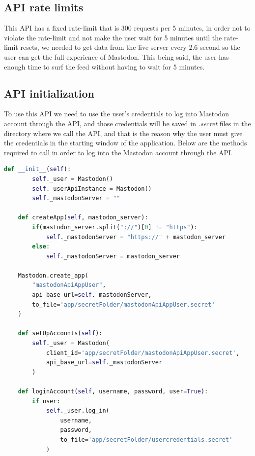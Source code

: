\subsection{API rate limits}\label{ss:rate_lim}
This API has a fixed rate-limit that is 300 requests per 5 minutes, in order not to
violate the rate-limit and not make the user wait for 5 minutes until the rate-limit resets, we
needed to get data from the live server every 2.6 second so the user can get the full
experience of Mastodon. This being said, the user has enough time to surf the feed without having
to wait for 5 minutes.
\subsection{API initialization}\label{ss:api_init}
To use this API we need to use the user's credentials to log into Mastodon account through the API, and those credentials will be saved in \textit{.secret} files in the directory where we call the API, and that is the reason why the user must give the credentials in the starting window of the application. Below are the methods required to call in order to log into the Mastodon account through the API.
\\[5pt]
\begin{lstlisting}[language=python, caption={Logging in to Mastodon account through the API}, captionpos=b ]
	def __init__(self):
		self._user = Mastodon()
		self._userApiInstance = Mastodon()
		self._mastodonServer = ""
	
	def createApp(self, mastodon_server):
		if(mastodon_server.split("://")[0] != "https"):
			self._mastodonServer = "https://" + mastodon_server
		else:
			self._mastodonServer = mastodon_server
	
	Mastodon.create_app(
		"mastodonApiAppUser",
		api_base_url=self._mastodonServer,
		to_file='app/secretFolder/mastodonApiAppUser.secret'
	)
	
	def setUpAccounts(self):
		self._user = Mastodon(
			client_id='app/secretFolder/mastodonApiAppUser.secret',
			api_base_url=self._mastodonServer
		)
	
	def loginAccount(self, username, password, user=True):
		if user:
			self._user.log_in(
				username,
				password,
				to_file='app/secretFolder/usercredentials.secret' 
			)
\end{lstlisting}
